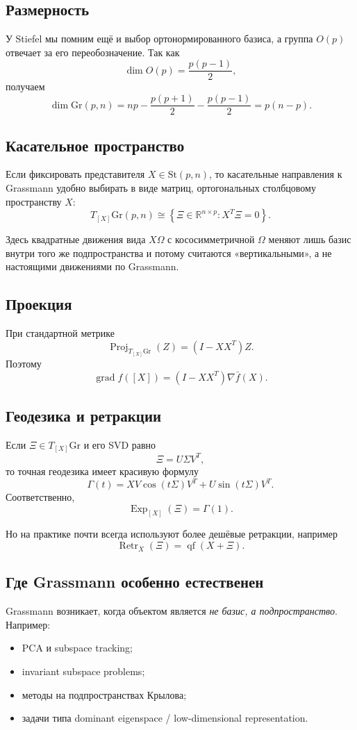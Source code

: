 \documentclass[12pt,a4paper]{article}
\theoremstyle{rudef}
\theoremstyle{ruplain}
\newcommand{\R}{\mathbb{R}}
\newcommand{\grad}{\operatorname{grad}}
\newcommand{\Proj}{\operatorname{Proj}}
\newcommand{\St}{\mathrm{St}}
\newcommand{\Gr}{\mathrm{Gr}}
\newcommand{\Exp}{\operatorname{Exp}}
\newcommand{\Retr}{\operatorname{Retr}}
\newcommand{\set}[1]{\left\{#1\right\}}
\begin{document}
\subsection{Размерность}

У Stiefel мы помним ещё и выбор ортонормированного базиса, а группа $O(p)$ отвечает за его переобозначение. Так как
\[
\dim O(p)=\frac{p(p-1)}{2},
\]
получаем
\[
\dim \Gr(p,n)=np-\frac{p(p+1)}{2}-\frac{p(p-1)}{2}=p(n-p).
\]

\subsection{Касательное пространство}

Если фиксировать представителя $X\in \St(p,n)$, то касательные направления к Grassmann удобно выбирать в виде матриц, ортогональных столбцовому пространству $X$:
\[
\boxed{\ T_{[X]}\Gr(p,n)\cong \set{\Xi\in \R^{n\times p}: X^T\Xi=0}.\ }
\]

Здесь квадратные движения вида $X\Omega$ с кососимметричной $\Omega$ меняют лишь базис внутри того же подпространства и потому считаются «вертикальными», а не настоящими движениями по Grassmann.

\subsection{Проекция}

При стандартной метрике
\[
\boxed{\ \Proj_{T_{[X]}\Gr}(Z)=(I-XX^T)Z.\ }
\]
Поэтому
\[
\grad f([X])=(I-XX^T)\nabla \bar f(X).
\]

\subsection{Геодезика и ретракции}

Если $\Xi\in T_{[X]}\Gr$ и его SVD равно
\[
\Xi = U\Sigma V^T,
\]
то точная геодезика имеет красивую формулу
\[
\Gamma(t)= X V\cos(t\Sigma)V^T + U\sin(t\Sigma)V^T.
\]
Соответственно,
\[
\Exp_{[X]}(\Xi)=\Gamma(1).
\]

Но на практике почти всегда используют более дешёвые ретракции, например
\[
\Retr_X(\Xi)=\operatorname{qf}(X+\Xi).
\]

\subsection{Где Grassmann особенно естественен}

Grassmann возникает, когда объектом является \emph{не базис, а подпространство}. Например:
\begin{itemize}
  \item PCA и subspace tracking;
  \item invariant subspace problems;
  \item методы на подпространствах Крылова;
  \item задачи типа dominant eigenspace / low-dimensional representation.
\end{itemize}
\end{document}
